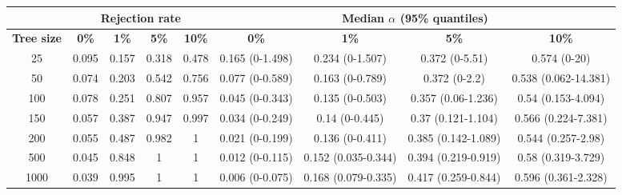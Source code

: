 \begin{tabular}{ccccccccc}
  \hline
  & \multicolumn{4}{c}{\textbf{Rejection rate}} & \multicolumn{4}{c}{\textbf{Median $\alpha$ (95\% quantiles)}} \\
  \hline
  \textbf{Tree size}    &    \textbf{0\%} & \textbf{1\%}  & \textbf{5\%}  &  \textbf{10\%}   &    \textbf{0\%} & \textbf{1\%}  & \textbf{5\%}  &  \textbf{10\%} \\
  \hline
  25   &    0.095     &    0.157  & 0.318     &    0.478     &    0.165 (0-1.498)     &    0.234 (0-1.507)     &    0.372 (0-5.51) &    0.574 (0-20)   \\
  50   &    0.074     &    0.203      &    0.542     &    0.756     &    0.077 (0-0.589)     &    0.163 (0-0.789)     &    0.372 (0-2.2)  &    0.538 (0.062-14.381)     \\
  100  &    0.078     &    0.251     &     0.807     &    0.957     &    0.045 (0-0.343)     &    0.135 (0-0.503)     &    0.357 (0.06-1.236)  &    0.54 (0.153-4.094)  \\
  150  &    0.057     &    0.387     &     0.947     &    0.997     &    0.034 (0-0.249)     &    0.14 (0-0.445) &    0.37 (0.121-1.104)  &    0.566 (0.224-7.381) \\
  200  &    0.055     &    0.487      &    0.982     &    1    &    0.021 (0-0.199)     &    0.136 (0-0.411)     &    0.385 (0.142-1.089) &    0.544 (0.257-2.98)  \\
  500  &    0.045     &    0.848     &     1    &    1    &    0.012 (0-0.115)     &    0.152 (0.035-0.344) &    0.394 (0.219-0.919) &    0.58 (0.319-3.729)  \\
  1000 &    0.039     &    0.995     &     1    &    1    &    0.006 (0-0.075)     &    0.168 (0.079-0.335) &    0.417 (0.259-0.844) &    0.596 (0.361-2.328) \\
  \hline
\end{tabular}